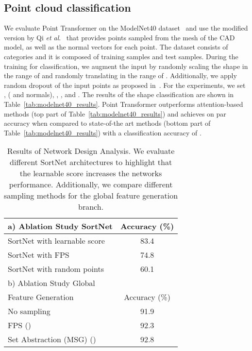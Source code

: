 \documentclass{ieeeaccess}
\begin{document}
\subsection{Point cloud classification}

We evaluate Point Transformer on the ModelNet40 dataset~\cite{wu20153d} and use the modified version by Qi \textit{et al}.~\cite{qi2017pointnet++} that provides  points sampled from the mesh of the CAD model, as well as the normal vectors for each point. The dataset consists of  categories and it is composed of  training samples and  test samples. During the training for classification, we augment the input by randomly scaling the shape in the range of  and randomly translating in the range of . Additionally, we apply random dropout of the input points as proposed in~\cite{qi2017pointnet,qi2017pointnet++}. For the experiments, we set ,  ( and normals), , ,  and .
The results of the shape classification are shown in Table~\ref{tab:modelnet40_results}. Point Transformer outperforms attention-based methods (top part of Table~\ref{tab:modelnet40_results}) and achieves on par accuracy when compared to state-of-the art methods (bottom part of Table~\ref{tab:modelnet40_results}) with a classification accuracy of .


\begin{table}[!t]
    \centering
        \caption{Results of Network Design Analysis. We evaluate different SortNet architectures to highlight that the learnable score increases the networks performance. Additionally, we compare different sampling methods for the global feature generation branch.}
        \label{tab:ablation_study_1}
        \begin{tabular}{@{}lc@{}}
            \toprule
            a) Ablation Study SortNet & \multicolumn{1}{l}{Accuracy (\%)} \\ \midrule
            SortNet with learnable score  & 83.4 \\
            SortNet with FPS & 74.8 \\
            SortNet with random points  & 60.1 \\
            \toprule
            b) Ablation Study Global  & \\
            Feature Generation & Accuracy (\%) \\ \midrule
            No sampling & 91.9 \\
            FPS () & 92.3 \\
            Set Abstraction (MSG) () & 92.8 \\
            \bottomrule
        \end{tabular}
 \end{table}
 
\end{document}
